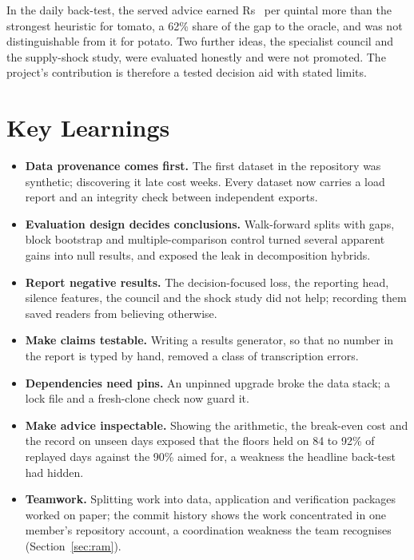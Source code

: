 In the daily back-test, the served advice earned Rs~\EngineTomatoGain{} per quintal more than the strongest heuristic for tomato, a 62\% share of the gap to the oracle, and was not distinguishable from it for potato. Two further ideas, the specialist council and the supply-shock study, were evaluated honestly and were not promoted. The project's contribution is therefore a tested decision aid with stated limits.

\section{Key Learnings}
\label{sec:key-learnings}

\begin{itemize}
    \item \textbf{Data provenance comes first.} The first dataset in the repository was synthetic; discovering it late cost weeks. Every dataset now carries a load report and an integrity check between independent exports.
    \item \textbf{Evaluation design decides conclusions.} Walk-forward splits with gaps, block bootstrap and multiple-comparison control turned several apparent gains into null results, and exposed the leak in decomposition hybrids.
    \item \textbf{Report negative results.} The decision-focused loss, the reporting head, silence features, the council and the shock study did not help; recording them saved readers from believing otherwise.
    \item \textbf{Make claims testable.} Writing a results generator, so that no number in the report is typed by hand, removed a class of transcription errors.
    \item \textbf{Dependencies need pins.} An unpinned upgrade broke the data stack; a lock file and a fresh-clone check now guard it.
    \item \textbf{Make advice inspectable.} Showing the arithmetic, the break-even cost and the record on unseen days exposed that the floors held on 84 to 92\% of replayed days against the 90\% aimed for, a weakness the headline back-test had hidden.
    \item \textbf{Teamwork.} Splitting work into data, application and verification packages worked on paper; the commit history shows the work concentrated in one member's repository account, a coordination weakness the team recognises (Section~\ref{sec:ram}).
\end{itemize}

